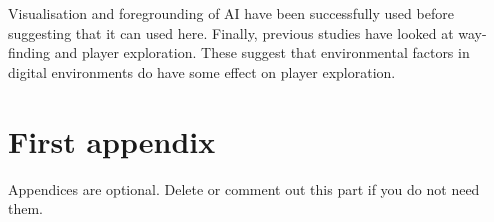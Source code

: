 \documentclass[journal]{IEEEtran}
\begin{document}
Visualisation and foregrounding of AI have been successfully used before suggesting that it can used here. Finally, previous studies have looked at way-finding and player exploration. These suggest that environmental factors in digital environments do have some effect on player exploration.







 \appendices
 \section{First appendix}
 Appendices are optional. Delete or comment out this part if you do not need them.

\end{document}
